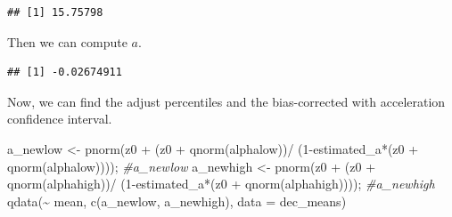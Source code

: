 \documentclass[12pt]{article}
\newenvironment{Shaded}{\begin{snugshade}}{\end{snugshade}}
\newcommand{\AttributeTok}[1]{\textcolor[rgb]{0.77,0.63,0.00}{#1}}
\newcommand{\CommentTok}[1]{\textcolor[rgb]{0.56,0.35,0.01}{\textit{#1}}}
\newcommand{\DecValTok}[1]{\textcolor[rgb]{0.00,0.00,0.81}{#1}}
\newcommand{\FloatTok}[1]{\textcolor[rgb]{0.00,0.00,0.81}{#1}}
\newcommand{\FunctionTok}[1]{\textcolor[rgb]{0.00,0.00,0.00}{#1}}
\newcommand{\NormalTok}[1]{#1}
\newcommand{\OtherTok}[1]{\textcolor[rgb]{0.56,0.35,0.01}{#1}}
\newcommand{\SpecialCharTok}[1]{\textcolor[rgb]{0.00,0.00,0.00}{#1}}
\begin{document}
\begin{verbatim}
## [1] 15.75798
\end{verbatim}

Then we can compute \(a\).

\begin{Shaded}
\end{Shaded}

\begin{verbatim}
## [1] -0.02674911
\end{verbatim}

Now, we can find the adjust percentiles and the bias-corrected with
acceleration confidence interval.

\begin{Shaded}
\begin{Highlighting}[]
\NormalTok{a\_newlow }\OtherTok{\textless{}{-}} \FunctionTok{pnorm}\NormalTok{(z0 }\SpecialCharTok{+}\NormalTok{ (z0 }\SpecialCharTok{+} \FunctionTok{qnorm}\NormalTok{(alphalow))}\SpecialCharTok{/}
\NormalTok{                    (}\DecValTok{1}\SpecialCharTok{{-}}\NormalTok{estimated\_a}\SpecialCharTok{*}\NormalTok{(z0 }\SpecialCharTok{+} \FunctionTok{qnorm}\NormalTok{(alphalow)))); }\CommentTok{\#a\_newlow}
\NormalTok{a\_newhigh }\OtherTok{\textless{}{-}} \FunctionTok{pnorm}\NormalTok{(z0 }\SpecialCharTok{+}\NormalTok{ (z0 }\SpecialCharTok{+} \FunctionTok{qnorm}\NormalTok{(alphahigh))}\SpecialCharTok{/}
\NormalTok{                     (}\DecValTok{1}\SpecialCharTok{{-}}\NormalTok{estimated\_a}\SpecialCharTok{*}\NormalTok{(z0 }\SpecialCharTok{+} \FunctionTok{qnorm}\NormalTok{(alphahigh)))); }\CommentTok{\#a\_newhigh}
\FunctionTok{qdata}\NormalTok{(}\SpecialCharTok{\textasciitilde{}}\NormalTok{ mean, }\FunctionTok{c}\NormalTok{(a\_newlow, a\_newhigh), }\AttributeTok{data =}\NormalTok{ dec\_means)}
\end{Highlighting}
\end{Shaded}
\end{document}
